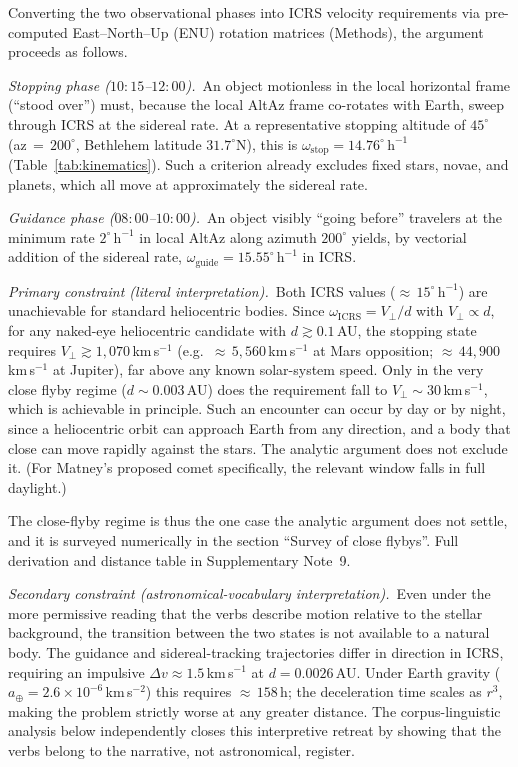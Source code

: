 \documentclass[sn-nature]{sn-jnl}
\begin{document}
Converting the two observational phases into ICRS velocity requirements via
pre-computed East--North--Up (ENU) rotation matrices (Methods), the argument
proceeds as follows.

\textit{Stopping phase ($10{:}15$--$12{:}00$).}~An object motionless in the
local horizontal frame (``stood over'') must, because the local AltAz
frame co-rotates with Earth, sweep through ICRS at the sidereal rate.
At a representative stopping altitude of $45^\circ$ (az\,$=\,200^\circ$,
Bethlehem latitude $31.7^\circ$N), this is $\omega_\mathrm{stop} = 14.76^\circ\,\mathrm{h}^{-1}$
(Table~\ref{tab:kinematics}). Such a criterion already excludes fixed stars, novae, and planets, 
which all move at approximately the sidereal rate.

\textit{Guidance phase ($08{:}00$--$10{:}00$).}~An object visibly ``going before''
travelers at the minimum rate $2^\circ\,\mathrm{h}^{-1}$ in local AltAz
along azimuth $200^\circ$ yields, by vectorial addition of the sidereal rate,
$\omega_\mathrm{guide} = 15.55^\circ\,\mathrm{h}^{-1}$ in ICRS.

\textit{Primary constraint (literal interpretation).}~Both ICRS values
(${\approx}\,15^\circ\,\mathrm{h}^{-1}$) are unachievable for standard heliocentric bodies.
Since $\omega_\mathrm{ICRS} = V_\perp/d$ with $V_\perp \propto d$, for any
naked-eye heliocentric candidate with $d \gtrsim 0.1$\,AU, the stopping
state requires $V_\perp \gtrsim 1{,}070$\,km\,s$^{-1}$ (e.g.\ ${\approx}\,5{,}560$\,km\,s$^{-1}$
at Mars opposition; ${\approx}\,44{,}900$\,km\,s$^{-1}$ at Jupiter), far above any known
solar-system speed. Only in the very close flyby regime
($d\!\sim\!0.003$\,AU) does the requirement fall to
$V_\perp\!\sim\!30$\,km\,s$^{-1}$, which is achievable in principle. Such an
encounter can occur by day or by night, since a heliocentric orbit can approach
Earth from any direction, and a body that close can move rapidly against the
stars. The analytic argument does not exclude it. (For Matney's proposed comet
specifically, the relevant window falls in full daylight.)

The close-flyby regime is thus the one case the analytic argument does not
settle, and it is surveyed numerically in the section ``Survey of close flybys''. Full
derivation and distance table in Supplementary Note~9.

\textit{Secondary constraint (astronomical-vocabulary interpretation).}~Even
under the more permissive reading that the verbs describe motion relative to
the stellar background, the transition between the two states is not available to a natural body.
The guidance and sidereal-tracking trajectories differ in direction in ICRS,
requiring an impulsive $\Delta v \approx 1.5$\,km\,s$^{-1}$ at $d = 0.0026$\,AU.
Under Earth gravity ($a_\oplus = 2.6\times10^{-6}$\,km\,s$^{-2}$) this
requires ${\approx}\,158$\,h; the deceleration time scales as $r^3$,
making the problem strictly worse at any greater distance.
The corpus-linguistic analysis below independently closes this interpretive
retreat by showing that the verbs belong to the narrative, not astronomical,
register.
\end{document}
